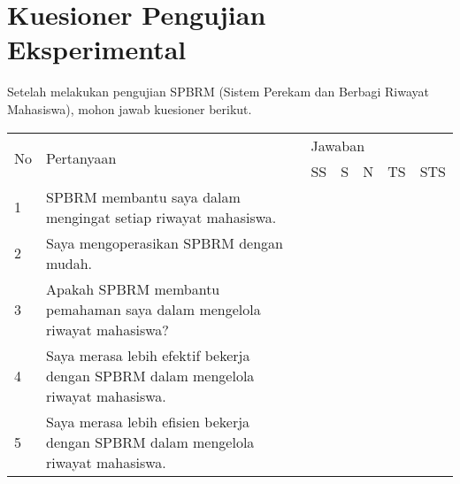 \chapter{Kuesioner Pengujian Eksperimental}
\label{kuesionerpengujianeksperimental}

Setelah melakukan pengujian SPBRM (Sistem Perekam dan Berbagi Riwayat Mahasiswa), mohon jawab kuesioner berikut.

\begin{table}[h]
\centering
\begin{tabular}{|l|p{5cm}|p{0.8cm}|p{0.8cm}|p{0.8cm}|p{0.8cm}|p{0.8cm}|}
\hline
\multirow{2}{*}{No} & \multirow{2}{*}{Pertanyaan}                                                       & \multicolumn{5}{l|}{Jawaban} \\ \cline{3-7} 
                    &                                                                                   & SS   & S   & N  & TS  & STS  \\ \hline
1                   & SPBRM membantu saya dalam mengingat setiap riwayat mahasiswa.                     &      &     &    &     &      \\ \hline
2                   & Saya mengoperasikan SPBRM dengan mudah.                                           &      &     &    &     &      \\ \hline
3                   & Apakah SPBRM membantu pemahaman saya dalam mengelola riwayat mahasiswa?           &      &     &    &     &      \\ \hline
4                   & Saya merasa lebih efektif bekerja dengan SPBRM dalam mengelola riwayat mahasiswa. &      &     &    &     &      \\ \hline
5                   & Saya merasa lebih efisien bekerja dengan SPBRM dalam mengelola riwayat mahasiswa. &      &     &    &     &      \\ \hline
\end{tabular}
\end{table}